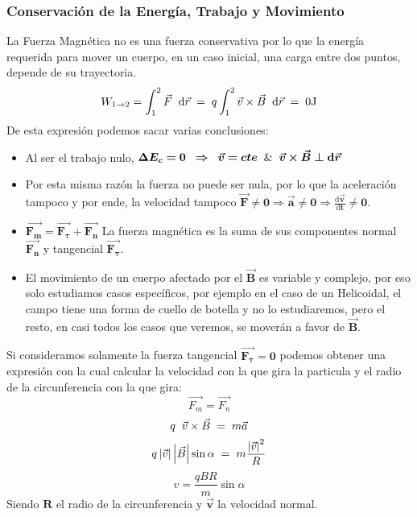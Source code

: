\subsubsection{Conservación de la Energía, Trabajo y Movimiento}
 La Fuerza Magnética no es una fuerza conservativa por lo que la energía requerida para mover un cuerpo, en un caso inicial, una carga entre dos puntos, depende de su trayectoria.
\[
        W_{1 \rightarrow 2}= \int^2_1\vec{F}\hspace{2mm}\mathrm{d}\vec{r} \hspace{1mm}=\hspace{1mm} q\int^2_1\vec{v}\times\vec{B}\hspace{2mm}\mathrm{d}\vec{r}\hspace{1mm}=\hspace{1mm}0 \textnormal{J}
\]
 De esta expresión podemos sacar varias conclusiones:
\begin{itemize}
        \item Al ser el trabajo nulo, \(\bm{\Delta E_c = 0} \hspace{2mm}\bm{\Rightarrow}\hspace{2mm}\bm{\vec{v}=cte} \hspace{2mm}\bm{\textnormal{\&}}\hspace{2mm} \bm{\vec{v}\times\vec{B}\perp\mathrm{d}\vec{r}}\)
        \item Por esta misma razón la fuerza no puede ser nula, por lo que la aceleración tampoco y por ende, la velocidad tampoco \(\bm{\vec{F}\not =0 \Rightarrow\vec{a}\not=0\Rightarrow\frac{\mathrm{d}\vec{v}}{\mathrm{d}t} \not=0}\).
        \item \(\bm{\vec{F_m} = \vec{F_\tau}+\vec{F_n}}\) La fuerza magnética es la suma de sus componentes normal \(\bm{\vec{F_n}}\) y tangencial \(\bm{\vec{F_\tau}}\).
        \item El movimiento de un cuerpo afectado por el \(\bm{\vec{B}}\) es variable y complejo, por eso solo estudiamos casos específicos, por ejemplo en el caso de un Helicoidal, el campo tiene una forma de cuello de botella y no lo estudiaremos, pero el resto, en casi todos los casos que veremos, se moverán a favor de \(\bm{\vec{B}}\).
\end{itemize}
 Si consideramos solamente la fuerza tangencial \(\bm{\vec{F_{\tau}}=0}\) podemos obtener una expresión con la cual calcular la velocidad con la que gira la particula y el radio de la circunferencia con la que gira:
\[
        \vec{F_m} = \vec{F_n}
\]
\[
        q\hspace{2mm} \vec{v} \times \vec{B} \hspace{1mm} = \hspace{1mm} m\vec{a}
\]
\[
        q\left | \vec{v} \right |\left | \vec{B} \right |\sin{\alpha} \hspace{1mm} = \hspace{1mm} m\frac{\left | \vec{v} \right |^2}{R}
\]
\[
        \boxed{v = \frac{qBR}{m}\sin{\alpha}}
\]
Siendo \(\bm{R}\) el radio de la circunferencia y \(\bm{\vec{v}}\) la velocidad normal.
